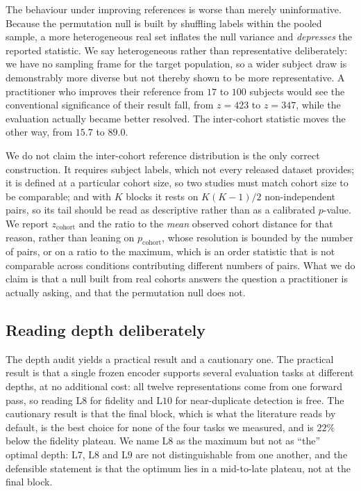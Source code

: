 \documentclass[preprint,12pt,authoryear]{elsarticle}
\newcommand{\Lb}[1]{\ensuremath{\mathrm{L}#1}}
\begin{document}
The behaviour under improving references is worse than merely uninformative.
Because the permutation null is built by shuffling labels within the pooled
sample, a more heterogeneous real set inflates the null variance and
\emph{depresses} the reported statistic. We say heterogeneous rather than
representative deliberately: we have no sampling frame for the target
population, so a wider subject draw is demonstrably more diverse but not
thereby shown to be more representative. A
practitioner who improves their reference from $17$ to $100$ subjects would see
the conventional significance of their result fall, from $z = 423$ to $z = 347$,
while the evaluation actually became better resolved. The inter-cohort
statistic moves the other way, from $15.7$ to $89.0$.

We do not claim the inter-cohort reference distribution is the only correct construction. It requires
subject labels, which not every released dataset provides; it is defined at a
particular cohort size, so two studies must match cohort size to be comparable;
and with $K$ blocks it rests on $K(K-1)/2$ non-independent pairs, so its tail
should be read as descriptive rather than as a calibrated $p$-value. We report
$z_{\mathrm{cohort}}$ and the ratio to the \emph{mean} observed cohort distance
for that reason, rather than leaning on $p_{\mathrm{cohort}}$, whose resolution
is bounded by the number of pairs, or on a ratio to the maximum, which is an
order statistic that is not comparable across conditions contributing different
numbers of pairs. What we do claim is that a null built from real
cohorts answers the question a practitioner is actually asking, and that the
permutation null does not.

\subsection{Reading depth deliberately}

The depth audit yields a practical result and a cautionary one. The practical
result is that a single frozen encoder supports several evaluation tasks at
different depths, at no additional cost: all twelve representations come from
one forward pass, so reading \Lb{8} for fidelity and \Lb{10} for near-duplicate
detection is free. The cautionary result is that the final block, which is what
the literature reads by default, is the best choice for none of the four tasks
we measured, and is $22\%$ below the fidelity plateau. We name \Lb{8} as the
maximum but not as ``the'' optimal depth: \Lb{7}, \Lb{8} and \Lb{9} are not
distinguishable from one another, and the defensible statement is that the
optimum lies in a mid-to-late plateau, not at the final block.
\end{document}
